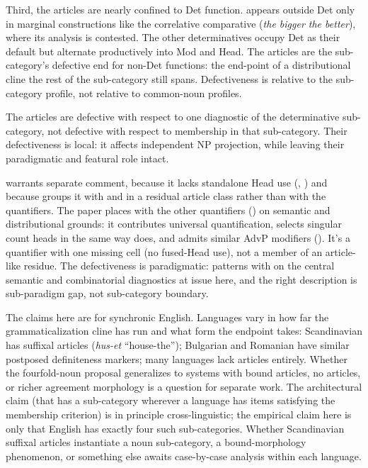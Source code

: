 \documentclass[12pt]{article}
\begin{document}
Third, the articles are nearly confined to Det function.  appears outside Det only in marginal constructions like the correlative comparative (\textit{the bigger the better}), where its analysis is contested. The other determinatives occupy Det as their default but alternate productively into Mod and Head. The articles are the sub-category's defective end for non-Det functions: the end-point of a distributional cline the rest of the sub-category still spans. Defectiveness is relative to the sub-category profile, not relative to common-noun profiles.

The articles are defective with respect to one diagnostic of the determinative sub-category, not defective with respect to membership in that sub-category. Their defectiveness is local: it affects independent NP projection, while leaving their paradigmatic and featural role intact.

 warrants separate comment, because it lacks standalone Head use (, ) and because \textcite{spinillo2004reconceptualising} groups it with  and  in a residual article class rather than with the quantifiers. The paper places  with the other quantifiers () on semantic and distributional grounds: it contributes universal quantification, selects singular count heads in the same way  does, and admits similar AdvP modifiers (). It's a quantifier with one missing cell (no fused-Head use), not a member of an article-like residue. The defectiveness is paradigmatic:  patterns with  on the central semantic and combinatorial diagnostics at issue here, and the right description is sub-paradigm gap, not sub-category boundary.

The claims here are for synchronic English. Languages vary in how far the grammaticalization cline has run and what form the endpoint takes: Scandinavian has suffixal articles (\textit{hus-et} \enquote{house-the}); Bulgarian and Romanian have similar postposed definiteness markers; many languages lack articles entirely. Whether the fourfold-noun proposal generalizes to systems with bound articles, no articles, or richer agreement morphology is a question for separate work. The architectural claim (that  has a sub-category wherever a language has items satisfying the membership criterion) is in principle cross-linguistic; the empirical claim here is only that English has exactly four such sub-categories. Whether Scandinavian suffixal articles instantiate a noun sub-category, a bound-morphology phenomenon, or something else awaits case-by-case analysis within each language.
\end{document}
